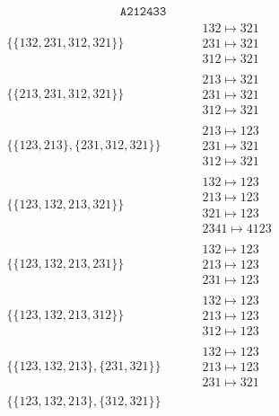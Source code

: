 \begin{tiny}
$$\begin{matrix}
\ 
\texttt{A212433}
\end{matrix}
$$
\vspace{-1em}
\begin{align}
\{\{132, 231, 312, 321\}\}
\quad
&
\phantom{.}
&
\begin{matrix}
132 \mapsto 321\\231 \mapsto 321\\312 \mapsto 321
\end{matrix}
\\
\{\{213, 231, 312, 321\}\}
\quad
&
\phantom{.}
&
\begin{matrix}
213 \mapsto 321\\231 \mapsto 321\\312 \mapsto 321
\end{matrix}
\\
\{\{123, 213\}, \{231, 312, 321\}\}
\quad
&
\phantom{.}
&
\begin{matrix}
213 \mapsto 123\\231 \mapsto 321\\312 \mapsto 321
\end{matrix}
\\
\{\{123, 132, 213, 321\}\}
\quad
&
\phantom{.}
&
\begin{matrix}
132 \mapsto 123\\213 \mapsto 123\\321 \mapsto 123\\2341 \mapsto 4123
\end{matrix}
\\
\{\{123, 132, 213, 231\}\}
\quad
&
\phantom{.}
&
\begin{matrix}
132 \mapsto 123\\213 \mapsto 123\\231 \mapsto 123
\end{matrix}
\\
\{\{123, 132, 213, 312\}\}
\quad
&
\phantom{.}
&
\begin{matrix}
132 \mapsto 123\\213 \mapsto 123\\312 \mapsto 123
\end{matrix}
\\
\{\{123, 132, 213\}, \{231, 321\}\}
\quad
&
\phantom{.}
&
\begin{matrix}
132 \mapsto 123\\213 \mapsto 123\\231 \mapsto 321
\end{matrix}
\\
\{\{123, 132, 213\}, \{312, 321\}\}

\end{align}
\end{tiny}

